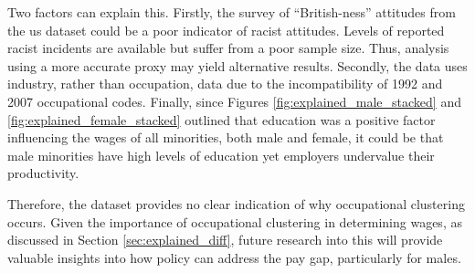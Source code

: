 \documentclass[class=article, crop=false]{standalone}
\begin{document}
Two factors can explain this. Firstly, the survey of \enquote{British-ness} attitudes from the \acrlong{us} dataset \citep{US} could be a poor indicator of racist attitudes. Levels of reported racist incidents are available but suffer from a poor sample size. Thus, analysis using a more accurate proxy may yield alternative results. Secondly, the data uses industry, rather than occupation, data due to the incompatibility of 1992 and 2007 occupational codes. Finally, since Figures \ref{fig:explained_male_stacked} and \ref{fig:explained_female_stacked} outlined that education was a positive factor influencing the wages of all minorities, both male and female, it could be that male minorities have high levels of education yet employers undervalue their productivity.

Therefore, the dataset provides no clear indication of why occupational clustering occurs. Given the importance of occupational clustering in determining wages, as discussed in Section \ref{sec:explained_diff}, future research into this will provide valuable insights into how policy can address the pay gap, particularly for males.

\end{document}
